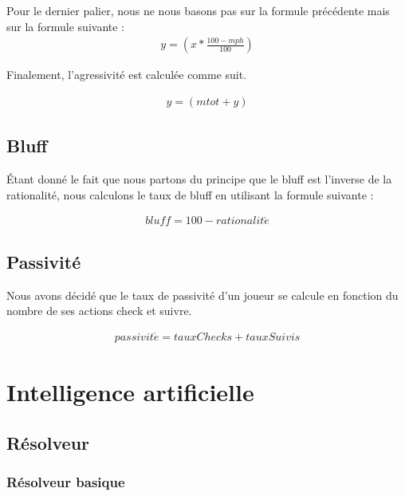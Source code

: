 \documentclass{report}
\begin{document}
Pour le dernier palier, nous ne nous basons pas sur la formule précédente mais sur la formule suivante :\\ 

\begin{align*}
	y=\left(x*\frac{100-mph}{100}\right)
\end{align*}

Finalement, l'agressivité est calculée comme suit. 

\begin{align*}
	y=\left(mtot + y\right)
\end{align*}

\section{Bluff}

\hspace{0.5cm}Étant donné le fait que nous partons du principe que le bluff est l'inverse de la rationalité, nous calculons le taux de bluff en utilisant la formule suivante : \par

\begin{align*}
	bluff=100-rationalit\acute{e}
\end{align*}


\section{Passivité}

\hspace{0.5cm}Nous avons décidé que le taux de passivité d'un joueur se calcule en fonction du nombre de ses actions check et suivre.\par
\begin{align*}
	passivit\acute{e}=tauxChecks+tauxSuivis
\end{align*}


\chapter{Intelligence artificielle}
\section{Résolveur}
\subsection{Résolveur basique}
\end{document}
